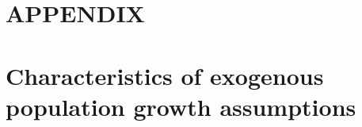 \documentclass[letterpaper,12pt]{article}
\theoremstyle{definition}
\begin{document}
\newpage
\renewcommand{\theequation}{A.\arabic{section}.\arabic{equation}}
\renewcommand{\thesection}{A-\arabic{section}}   %
\setcounter{equation}{0}                         %
\setcounter{section}{0}                          %
\section*{APPENDIX}                              %


\section{Characteristics of exogenous population growth assumptions}\label{AppPopGrowth}
\end{document}
